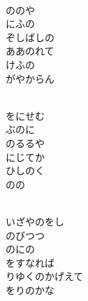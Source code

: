 \documentclass[10pt,b5j]{tarticle} %
\begin{document}
\vspace{1.5em} %
\newcommand{\linespace}{0.5em} %
\newcommand{\blocksize}{0.5\hsize} %
\newcommand{\itemmargin}{3em} %
\begin{enumerate} %
    \setlength{\itemindent}{\itemmargin} %
    \begin{minipage}[c]{\blocksize}
    
        \vspace{\linespace}
        \item~\\
        ののや\\
        にふの\\
        ぞしばしの\\
        ああのれて\\
        けふの\\
        がやからん
        
    \end{minipage}
    \begin{minipage}[c]{\blocksize}
        
        \vspace{\linespace}
        \item~\\
        をにせむ\\
        ぶのに\\
        のるるや\\
        にじてか\\
        ひしのく\\
        のの
        
    \end{minipage}
    \begin{minipage}[c]{\blocksize}
        
        \vspace{\linespace}
        \item~\\
        いざやのをし\\
        のびつつ\\
        のにの\\
        をすなれば\\
        りゆくのかげえて\\
        をりのかな
        

\end{minipage}
\end{enumerate}
\end{document}
